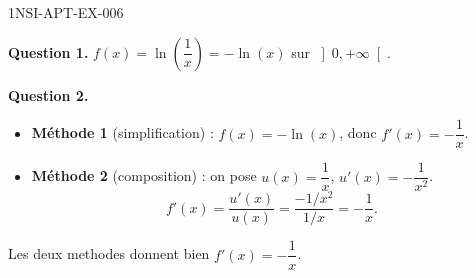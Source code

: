\begin{corrige}{1NSI-APT-EX-006}

\textbf{Question 1.} $f(x) = \ln\!\left(\dfrac{1}{x}\right) = -\ln(x)$ sur $\left]0,+\infty\right[$.


\textbf{Question 2.}
\begin{itemize}
  \item \textbf{Méthode 1} (simplification) : $f(x) = -\ln(x)$, donc $f'(x) = -\dfrac{1}{x}$.
  \item \textbf{Méthode 2} (composition) : on pose $u(x) = \dfrac{1}{x}$, $u'(x) = -\dfrac{1}{x^2}$.
  \[ f'(x) = \frac{u'(x)}{u(x)} = \frac{-1/x^2}{1/x} = -\frac{1}{x}. \]
\end{itemize}
Les deux methodes donnent bien $f'(x) = -\dfrac{1}{x}$.

\end{corrige}

